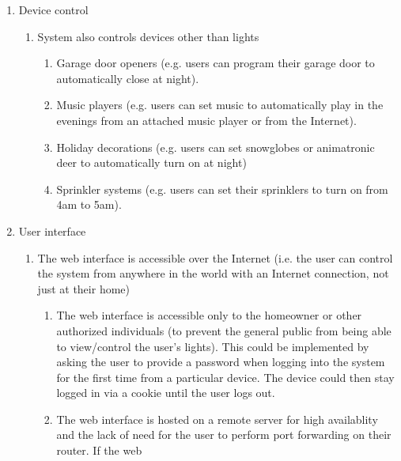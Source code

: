 \begin{enumerate}[resume]
    \item Device control
        \begin{enumerate}
            \item System also controls devices other than lights
                \begin{enumerate}
                    \item Garage door openers (e.g. users can program their
                        garage door to automatically close at night).
                    \item Music players (e.g. users can set music to
                        automatically play in the evenings from an attached
                        music player or from the Internet).
                    \item Holiday decorations (e.g. users can set snowglobes or
                        animatronic deer to automatically turn on at night)
                    \item Sprinkler systems (e.g. users can set their
                        sprinklers to turn on from 4am to 5am).
                \end{enumerate}
        \end{enumerate}
    \item User interface
        \begin{enumerate}
            \item The web interface is accessible over the Internet (i.e. the
                user can control the system from anywhere in the world with an
                Internet connection, not just at their home)
                \begin{enumerate}
                    \item The web interface is accessible only to the homeowner
                        or other authorized individuals (to prevent the general
                        public from being able to view/control the user's
                        lights).  This could be implemented by asking the user
                        to provide a password when logging into the system for
                        the first time from a particular device.  The device
                        could then stay logged in via a cookie until the user
                        logs out.
                    \item The web interface is hosted on a remote server for
                        high availablity and the lack of need for the user to
                        perform port forwarding on their router.  If the web

\end{enumerate}
\end{enumerate}
\end{enumerate}
